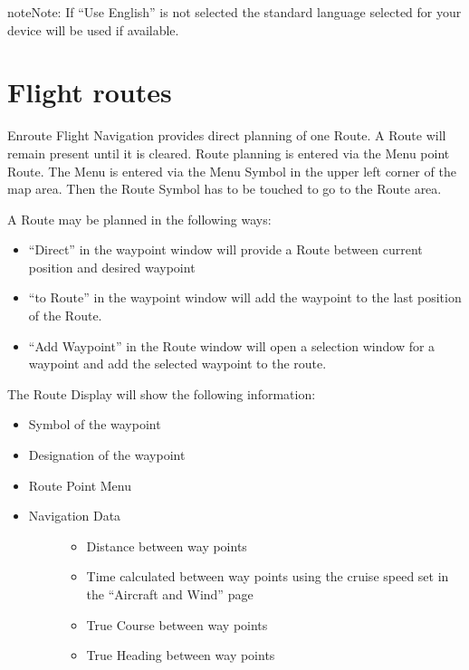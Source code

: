 \documentclass[letterpaper,10pt,english]{sphinxmanual}
\begin{document}
\begin{sphinxadmonition}{note}{Note:}
If “Use English” is not selected the standard language selected for your device will be used if available.
\end{sphinxadmonition}


\section{Flight routes}
\label{\detokenize{01-intro/further_steps:flight-routes}}
Enroute Flight Navigation provides direct planning of one Route. A Route will remain present until it is cleared.
Route planning is entered via the Menu point Route. The Menu is entered via the Menu Symbol in the upper left corner of the map area. Then the Route Symbol has to be touched to go to the Route area.

A Route may be planned in the following ways:
\begin{itemize}
\item {} 
“Direct” in the waypoint window will provide a Route between current position and desired waypoint

\item {} 
“to Route” in the waypoint window will add the waypoint to the last position of the Route.

\item {} 
“Add Waypoint” in the Route window will open a selection window for a waypoint and add the selected waypoint to the route.

\end{itemize}

The Route Display will show the following information:
\begin{itemize}
\item {} 
Symbol of the waypoint

\item {} 
Designation of the waypoint

\item {} 
Route Point Menu

\item {} \begin{description}
\item[{Navigation Data}] \leavevmode\begin{itemize}
\item {} 
Distance between way points

\item {} 
Time calculated between way points using the cruise speed set in the “Aircraft and Wind” page

\item {} 
True Course between way points

\item {} 
True Heading between way points

\end{itemize}

\end{description}

\end{itemize}
\end{document}
